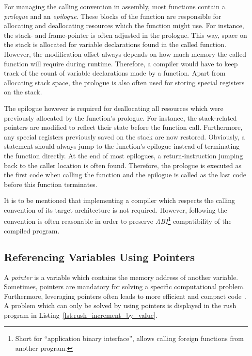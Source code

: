 For managing the calling convention in assembly, most functions contain a \emph{prologue} and an \emph{epilogue}.
These blocks of the function are responsible for allocating and deallocating resources which the function might use.
For instance, the stack- and frame-pointer is often adjusted in the prologue.
This way, space on the stack is allocated for variable declarations found in the called function.
However, the modification offset always depends on how much memory the called function will require during runtime.
Therefore, a compiler would have to keep track of the count of variable declarations made by a function.
Apart from allocating stack space, the prologue is also often used for storing special registers on the stack.

The epilogue however is required for deallocating all resources which were previously allocated by the function's prologue.
For instance, the stack-related pointers are modified to reflect their state before the function call.
Furthermore, any special registers previously saved on the stack are now restored.
Obviously, a  statement should always jump to the function's epilogue instead of terminating the function directly.
At the end of most epilogues, a return-instruction jumping back to the caller location is often found.
Therefore, the prologue is executed as the first code when calling the function and the epilogue is called as the last code before this function terminates.

It is to be mentioned that implementing a compiler which respects the calling convention of its target architecture is not required.
However, following the convention is often reasonable in order to preserve \emph{ABI}\footnote{Short for \enquote{application binary interface}, allows calling foreign functions from another program.} compatibility of the compiled program.

\subsection{Referencing Variables Using Pointers}\label{sec:pointers}

A \emph{pointer} is a variable which contains the memory address of another variable.
Sometimes, pointers are mandatory for solving a specific computational problem.
Furthermore, leveraging pointers often leads to more efficient and compact code~\cite[p.~93]{Ritchie1988}.
A problem which can only be solved by using pointers is displayed in the rush program in Listing~\ref{lst:rush_increment_by_value}.

